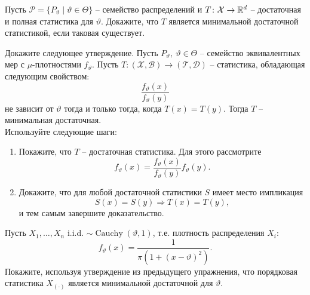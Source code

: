 \begin{exc}
	Пусть $\mathcal{P}= \{ P_\vartheta \mid \vartheta \in \Theta \}$ -- семейство распределений и $T\colon\mathcal{X} \rightarrow \mathbb{R}^d$ -- достаточная и полная статистика для $\vartheta$. Докажите, что $T$ является минимальной достаточной статистикой, если таковая существует.
\end{exc}

\begin{exc}
	Докажите следующее утверждение. Пусть $P_\vartheta,\ \vartheta \in \Theta$ -- семейство эквивалентных мер с $\mu$-плотностями $f_\vartheta$. Пусть $T\colon (\mathcal{X}, \mathcal{B}) \rightarrow (\mathcal{T}, \mathcal{D})$ -- статистика, обладающая следующим свойством:
	\[\frac{f_\vartheta(x)}{f_\vartheta(y)} \]
	не зависит от $\vartheta$ тогда и только тогда, когда $T(x) = T(y)$. Тогда $T$ -- минимальная достаточная. \\
	Используйте следующие шаги:
	\begin{enumerate}
		\item Покажите, что $T$ -- достаточная статистика. Для этого рассмотрите
		\[f_\vartheta(x) = \frac{f_\vartheta(x)}{f_\vartheta(y)} f_\vartheta(y). \]
		\item Докажите, что для любой достаточной статистики $S$ имеет место импликация
		\[ S(x) = S(y) \Longrightarrow T(x) = T(y), \]
		и тем самым завершите доказательство.
	\end{enumerate}
\end{exc}

\begin{exc}
	Пусть $X_1, \dots, X_n$ i.i.d. $\sim \operatorname{Cauchy}(\vartheta, 1)$, т.е. плотность распределения $X_i$:
	\[ f_\vartheta(x) = \frac{1}{\pi (1 + (x-\vartheta)^2)}. \]
	Покажите, используя утверждение из предыдущего упражнения, что порядковая статистика $X_{(\cdot)}$ является минимальной достаточной для $\vartheta$.
\end{exc}